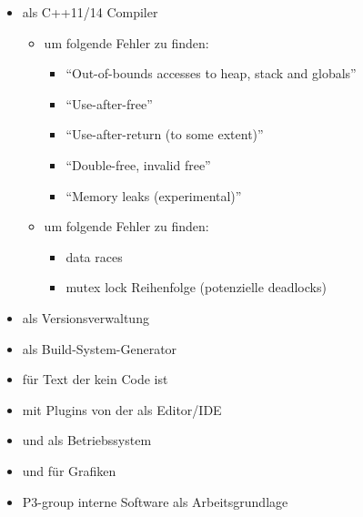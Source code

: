     \begin{itemize}
      \item {} als C++11/14 Compiler
        \begin{itemize}
          \item {} um folgende Fehler zu finden:
            \begin{itemize}
              \item ``Out-of-bounds accesses to heap, stack and globals''
              \item ``Use-after-free''
              \item ``Use-after-return (to some extent)''
              \item ``Double-free, invalid free''
              \item ``Memory leaks (experimental)''
            \end{itemize}
          \item {} um folgende Fehler zu finden:
            \begin{itemize}
              \item data races
              \item mutex lock Reihenfolge (potenzielle deadlocks)
             \end{itemize}
        \end{itemize}
      \item {} als Versionsverwaltung
      \item {} als Build-System-Generator
      \item {} für Text der kein Code ist
      \item {} mit Plugins von der  als Editor/IDE
      \item {} und  als Betriebssystem
      \item {} und  für Grafiken
      \item P3-group interne Software als Arbeitsgrundlage
    \end{itemize}

